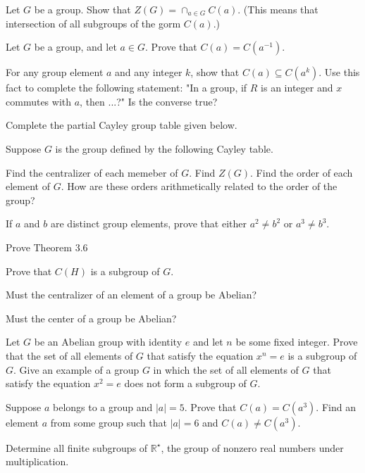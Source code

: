 \documentclass[11pt,largemargins]{homework}
\begin{document}
\question
Let $G$ be a group. Show that $Z(G)= \cap_{a\in G}C(a)$. (This means that intersection of all subgroups 
of the gorm $C(a)$.)

\question
Let $G$ be a group, and let $a\in G$. Prove that $C(a)=C(a^{-1})$.

\question
For any group element $a$ and any integer $k$, show that $C(a)\subseteq C(a^k)$.
Use this fact to complete the following statement: "In a group, if $R$ is an integer and $x$ commutes with $a$, then ...?"
Is the converse true?

\question
Complete the partial Cayley group table given below.

\question
Suppose $G$ is the group defined by the following Cayley table.

\begin{alphaparts}
    \questionpart
    Find the centralizer of each memeber of $G$.
    \questionpart
    Find $Z(G)$.
    \questionpart
    Find the order of each element of $G$. How are these orders arithmetically related to the order of the group?
\end{alphaparts}

\question
If $a$ and $b$ are distinct group elements, prove that either $a^2\neq b^2$ or $a^3\neq b^3$.

\question
Prove Theorem 3.6

\question
Prove that $C(H)$ is a subgroup of $G$.

\question
Must the centralizer of an element of a group be Abelian?

\question
Must the center of a group be Abelian?

\question
Let $G$ be an Abelian group with identity $e$ and let $n$ be some fixed integer. Prove that the set of all elements 
of $G$ that satisfy the equation $x^n=e$ is a subgroup of $G$. Give an example of a group $G$ in which the set of all elements of 
$G$ that satisfy the equation $x^2=e$ does not form a subgroup of $G$.

\question
Suppose $a$ belongs to a group and $|a|=5$. Prove that $C(a)=C(a^3)$. Find an element $a$ from some group such 
that $|a|=6$ and $C(a)\neq C(a^3)$.

\question
Determine all finite subgroups of $\mathbb{R}^{\star}$, the group of nonzero real numbers under multiplication.
\end{document}
